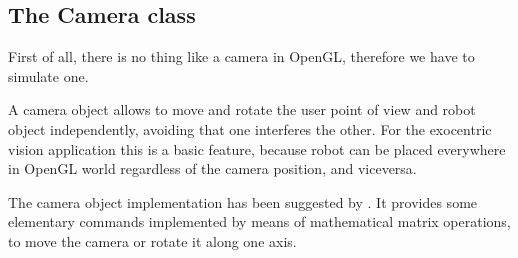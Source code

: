 \subsection{The Camera class}
First of all, there is no thing like a camera in OpenGL, therefore we have to
simulate one.
%

%
A camera object allows to move and rotate the user point of view and robot
object independently, avoiding that one interferes the other. For the exocentric
vision application this is a basic feature, because robot can be placed
everywhere in OpenGL world regardless of the camera position, and viceversa.
%

%
The camera object implementation has been suggested by \cite{opengl:camera}.
It provides some elementary commands implemented by means of mathematical matrix
operations, to move the camera or rotate it along one axis.
